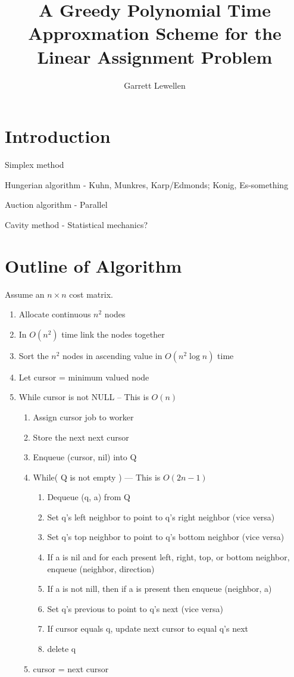 \documentclass{article}
\begin{document}
\author{Garrett Lewellen}
\title{A Greedy Polynomial Time Approxmation Scheme for the Linear Assignment Problem}

\maketitle

\section{Introduction}

Simplex method

Hungerian algorithm - Kuhn, Munkres, Karp/Edmonds; Konig, Es-something

Auction algorithm - Parallel

Cavity method - Statistical mechanics?

\section{Outline of Algorithm}

Assume an $n \times n$ cost matrix.

\begin{enumerate}
	\item Allocate continuous $n^2$ nodes
	\item In $O(n^2)$ time link the nodes together
	\item Sort the $n^2$ nodes in ascending value in $O(n^2 \log n)$ time
	\item Let cursor = minimum valued node
	\item While cursor is not NULL -- This is $O(n)$
	\begin{enumerate}
		\item Assign cursor job to worker
		\item Store the next next cursor
		\item Enqueue (cursor, nil) into Q
		\item While( Q is not empty )  --- This is $O(2n - 1)$
		\begin{enumerate}
			\item Dequeue (q, a) from Q
			\item Set q's left neighbor to point to q's right neighbor (vice versa)
			\item Set q's top neighbor to point to q's bottom neighbor (vice versa)
			\item If a is nil and for each present left, right, top, or bottom neighbor, enqueue (neighbor, direction)
			\item If a is not nill, then if a is present then enqueue (neighbor, a)
			\item Set q's previous to point to q's next (vice versa)
			\item If cursor equals q, update next cursor to equal q's next
			\item delete q
		\end{enumerate}
		\item cursor = next cursor
	\end{enumerate}
\end{enumerate}
\end{document}
